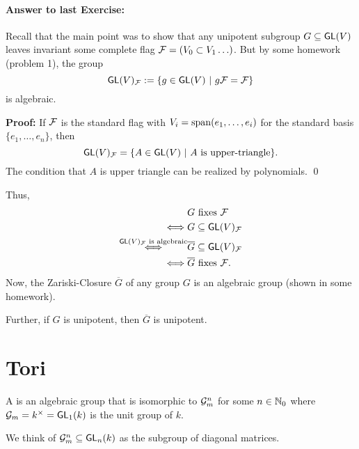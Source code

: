 
\paragraph{Answer to last Exercise:} Recall that the main point was to show that any unipotent subgroup $G \subseteq \textsf{GL}(V)$ leaves invariant some complete flag $\mathcal{F} = (V_0 \subset V_1 \ldots)$. But by some homework (problem 1), the group
\[ \textsf{GL}(V)_{\mathcal{F}} := \left\lbrace g \in \textsf{GL}(V) ~ | ~ g\mathcal{F} = \mathcal{F}\right\rbrace \]
is algebraic.

\textbf{Proof:} If $\mathcal{F}$ is the standard flag with $V_i = \mathrm{span}(e_1, \ldots, e_i)$ for the standard basis $\{e_1, \ldots, e_n\}$, then
\[ \textsf{GL}(V)_{\mathcal{F}} = \{ A \in \textsf{GL}(V) ~|~ A \text{ is upper-triangle} \}. \]
The condition that $A$ is upper triangle can be realized by polynomials. \qed


Thus,
\begin{align*}
& G \text{ fixes }\mathcal{F}\\
\iff & G \subseteq \textsf{GL}(V)_{\mathcal{F}}\\
\overset{\textsf{GL}(V)_{\mathcal{F}} \text{ is algebraic}}{\iff}& \overline{G} \subseteq\textsf{GL}(V)_{\mathcal{F}}\\
\iff & \overline{G} \text{ fixes } \mathcal{F}.
\end{align*}
Now, the Zariski-Closure $\overline{G}$ of any group $G$ is an algebraic group (shown in some homework).

Further, if $G$ is unipotent, then $\overline{G}$ is unipotent.

\newpage
\section{Tori}
\begin{definition}
A  is an algebraic group that is isomorphic to $\mathcal{G}_m^n$ for some $n \in \mathbb{N}_0$ where $\mathcal{G}_m = k^\times = \textsf{GL}_1(k)$ is the unit group of $k$.

We think of $\mathcal{G}_m^n \subseteq \textsf{GL}_n(k)$ as the subgroup of diagonal matrices.
\end{definition}

